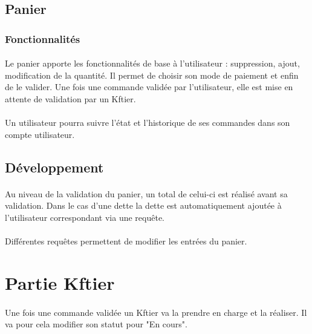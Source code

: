 \documentclass[twoside,UTF8]{EPURapport}
\begin{document}
        \subsection{Panier}

            \subsubsection{Fonctionnalités}
                
                \paragraph{}Le panier apporte les fonctionnalités de base à l'utilisateur : suppression, ajout, modification de la quantité. Il permet de choisir son mode de paiement et enfin de le valider. Une fois une commande validée par l'utilisateur, elle est mise en attente de validation par un Kftier.

                \paragraph{}Un utilisateur pourra suivre l'état et l'historique de ses commandes dans son compte utilisateur.

            \subsection{Développement}

                \paragraph{}Au niveau de la validation du panier, un total de celui-ci est réalisé avant sa validation. Dans le cas d'une dette la dette est automatiquement ajoutée à l'utilisateur correspondant via une requête.

                \paragraph{}Différentes requêtes permettent de modifier les entrées du panier.

    \section{Partie Kftier}

        \paragraph{}Une fois une commande validée un Kftier va la prendre en charge et la réaliser. Il va pour cela modifier son statut pour "En cours".
\end{document}
